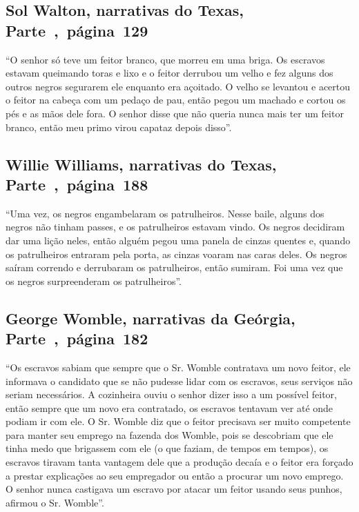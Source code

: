 \subsection{Sol Walton, narrativas do Texas, Parte~,~página~129}
\label{ref276}

``O senhor só teve um feitor branco, que morreu em uma briga. Os
escravos estavam queimando toras e lixo e o feitor derrubou um velho e
fez alguns dos outros negros segurarem ele enquanto era açoitado. O
velho se levantou e acertou o feitor na cabeça com um pedaço de pau,
então pegou um machado e cortou os pés e as mãos dele fora. O senhor
disse que não queria nunca mais ter um feitor branco, então meu primo
virou capataz depois disso''.

\subsection{Willie Williams, narrativas do Texas, Parte~,~página~188}
\label{ref294}

``Uma vez, os negros engambelaram os patrulheiros. Nesse baile, alguns
dos negros não tinham passes, e os patrulheiros estavam vindo. Os negros
decidiram dar uma lição neles, então alguém pegou uma panela de cinzas
quentes e, quando os patrulheiros entraram pela porta, as cinzas voaram
nas caras deles. Os negros saíram correndo e derrubaram os patrulheiros,
então sumiram. Foi uma vez que os negros surpreenderam os
patrulheiros''.

\subsection{George Womble, narrativas da Geórgia, Parte~,~página~182}
\label{ref311}

``Os escravos sabiam que sempre que o Sr. Womble contratava um novo
feitor, ele informava o candidato que se não pudesse lidar com os
escravos, seus serviços não seriam necessários. A cozinheira ouviu o
senhor dizer isso a um possível feitor, então sempre que um novo era
contratado, os escravos tentavam ver até onde podiam ir com ele. O Sr.
Womble diz que o feitor precisava ser muito competente para manter seu
emprego na fazenda dos Womble, pois se descobriam que ele tinha medo que
brigassem com ele (o que faziam, de tempos em tempos), os escravos
tiravam tanta vantagem dele que a produção decaía e o feitor era forçado
a prestar explicações ao seu empregador ou então a procurar um novo
emprego. O senhor nunca castigava um escravo por atacar um feitor usando
seus punhos, afirmou o Sr. Womble''.

